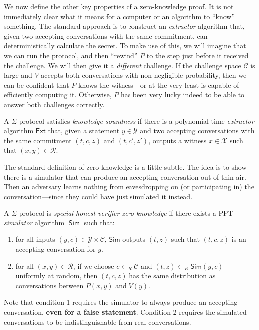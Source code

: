 \documentclass[12pt,a4paper]{article}
\DeclareMathOperator{\Sim}{\mathsf{Sim}}
\theoremstyle{definition}
\begin{document}
We now define the other key properties of a zero-knowledge proof. It is not immediately clear what it means for a computer or an algorithm to ``know'' something. The standard approach is to construct an \textit{extractor} algorithm that, given two accepting conversations with the same commitment, can deterministically calculate the secret. To make use of this, we will imagine that we can run the protocol, and then ``rewind'' $P$ to the step just before it received the challenge. We will then give it a \textit{different} challenge. If the challenge space $\mathcal{C}$ is large and $V$ accepts both conversations with non-negligible probability, then we can be confident that $P$ knows the witness---or at the very least is capable of efficiently computing it. Otherwise, $P$ has been very lucky indeed to be able to answer both challenges correctly.

\begin{definition}
    A $\Sigma$-protocol satisfies \textit{knowledge soundness} if there is a polynomial-time \textit{extractor} algorithm $\mathsf{Ext}$ that, given a statement $y\in\mathcal{Y}$ and two accepting conversations with the same commitment $(t, c, z)$ and $(t, c', z')$, outputs a witness $x\in\mathcal{X}$ such that $(x, y)\in\mathcal{R}$.
\end{definition}
The standard definition of zero-knowledge is a little subtle. The idea is to show there is a simulator that can produce an accepting conversation out of thin air. Then an adversary learns nothing from eavesdropping on (or participating in) the conversation---since they could have just simulated it instead.
\begin{definition}
    A $\Sigma$-protocol is \textit{special honest verifier zero knowledge} if there exists a PPT \textit{simulator} algorithm $\Sim$ such that:
    \begin{enumerate}
        \item for all inputs $(y, c)\in\mathcal{Y}\times\mathcal{C}$, $\mathsf{Sim}$ outputs $(t, z)$ such that $(t, c, z)$ is an accepting conversation for $y$.
        \item for all $(x, y)\in\mathcal{R}$, if we choose $c\gets_R\mathcal{C}$ and $(t, z)\gets_R\mathsf{Sim}(y, c)$ uniformly at random, then $(t, c, z)$ has the same distribution as conversations between $P(x, y)$ and $V(y)$.
    \end{enumerate}
\end{definition}
Note that condition 1 requires the simulator to always produce an accepting conversation, \textbf{even for a false statement}. Condition 2 requires the simulated conversations to be indistinguishable from real conversations.
\end{document}
